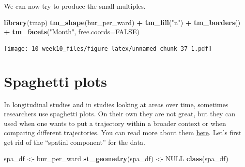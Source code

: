 \documentclass[]{book}
\newenvironment{Shaded}{\begin{snugshade}}{\end{snugshade}}
\newcommand{\CommentTok}[1]{\textcolor[rgb]{0.56,0.35,0.01}{\textit{#1}}}
\newcommand{\DataTypeTok}[1]{\textcolor[rgb]{0.13,0.29,0.53}{#1}}
\newcommand{\DecValTok}[1]{\textcolor[rgb]{0.00,0.00,0.81}{#1}}
\newcommand{\KeywordTok}[1]{\textcolor[rgb]{0.13,0.29,0.53}{\textbf{#1}}}
\newcommand{\NormalTok}[1]{#1}
\newcommand{\OperatorTok}[1]{\textcolor[rgb]{0.81,0.36,0.00}{\textbf{#1}}}
\newcommand{\OtherTok}[1]{\textcolor[rgb]{0.56,0.35,0.01}{#1}}
\newcommand{\StringTok}[1]{\textcolor[rgb]{0.31,0.60,0.02}{#1}}
\begin{document}
\begin{Shaded}
\end{Shaded}

We can now try to produce the small multiples.

\begin{Shaded}
\begin{Highlighting}[]
\KeywordTok{library}\NormalTok{(tmap)}
\KeywordTok{tm_shape}\NormalTok{(bur_per_ward) }\OperatorTok{+}\StringTok{ }
\StringTok{  }\KeywordTok{tm_fill}\NormalTok{(}\StringTok{"n"}\NormalTok{) }\OperatorTok{+}
\StringTok{  }\KeywordTok{tm_borders}\NormalTok{() }\OperatorTok{+}
\StringTok{  }\KeywordTok{tm_facets}\NormalTok{(}\StringTok{"Month"}\NormalTok{, }\DataTypeTok{free.coords=}\OtherTok{FALSE}\NormalTok{)}
\end{Highlighting}
\end{Shaded}

\texttt{[image: 10-week10\_files/figure-latex/unnamed-chunk-37-1.pdf]}

\hypertarget{spaghetti-plots}{%
\section{Spaghetti plots}\label{spaghetti-plots}}

In longitudinal studies and in studies looking at areas over time, sometimes researchers use spaghetti plots. On their own they are not great, but they can used when one wants to put a trajectory within a broader context or when comparing different trajectories. You can read more about them \href{https://www.storytellingwithdata.com/blog/2013/03/avoiding-spaghetti-graph}{here}. Let's first get rid of the ``spatial component'' for the data.

\begin{Shaded}
\begin{Highlighting}[]
\NormalTok{spa_df <-}\StringTok{ }\NormalTok{bur_per_ward}
\KeywordTok{st_geometry}\NormalTok{(spa_df) <-}\StringTok{ }\OtherTok{NULL}
\KeywordTok{class}\NormalTok{(spa_df)}
\end{Highlighting}
\end{Shaded}
\end{document}
